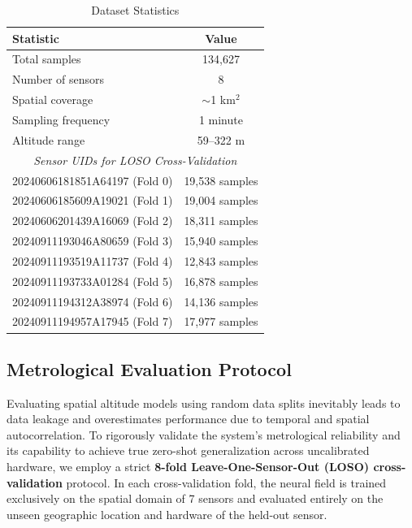 \begin{table}[t]
\caption{Dataset Statistics}
\label{tab:dataset}
\centering
\begin{tabular}{lc}
\toprule
\textbf{Statistic} & \textbf{Value} \\
\midrule
Total samples & 134,627 \\
Number of sensors & 8 \\
Spatial coverage & $\sim$1 km$^2$ \\
Sampling frequency & 1 minute \\
Altitude range & 59--322 m \\
\midrule
\multicolumn{2}{c}{\textit{Sensor UIDs for LOSO Cross-Validation}} \\
\midrule
20240606181851A64197 (Fold 0) & 19,538 samples \\
20240606185609A19021 (Fold 1) & 19,004 samples \\
20240606201439A16069 (Fold 2) & 18,311 samples \\
20240911193046A80659 (Fold 3) & 15,940 samples \\
20240911193519A11737 (Fold 4) & 12,843 samples \\
20240911193733A01284 (Fold 5) & 16,878 samples \\
20240911194312A38974 (Fold 6) & 14,136 samples \\
20240911194957A17945 (Fold 7) & 17,977 samples \\
\bottomrule
\end{tabular}
\end{table}


\subsection{Metrological Evaluation Protocol}
\label{subsec:eval_protocol}

Evaluating spatial altitude models using random data splits inevitably leads to data leakage and overestimates performance due to temporal and spatial autocorrelation. To rigorously validate the system's metrological reliability and its capability to achieve true zero-shot generalization across uncalibrated hardware, we employ a strict \textbf{8-fold Leave-One-Sensor-Out (LOSO) cross-validation} protocol. In each cross-validation fold, the neural field is trained exclusively on the spatial domain of 7 sensors and evaluated entirely on the unseen geographic location and hardware of the held-out sensor.

